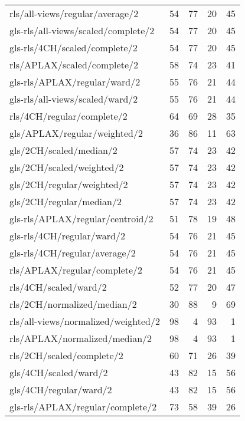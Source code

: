 \begin{longtable}{lrrrr}
    rls/all-views/regular/average/2           & 54 & 77 & 20 & 45 \\
    gls-rls/all-views/scaled/complete/2       & 54 & 77 & 20 & 45 \\
    gls-rls/4CH/scaled/complete/2             & 54 & 77 & 20 & 45 \\
    rls/APLAX/scaled/complete/2               & 58 & 74 & 23 & 41 \\
    gls-rls/APLAX/regular/ward/2              & 55 & 76 & 21 & 44 \\
    gls-rls/all-views/scaled/ward/2           & 55 & 76 & 21 & 44 \\
    rls/4CH/regular/complete/2                & 64 & 69 & 28 & 35 \\
    gls/APLAX/regular/weighted/2              & 36 & 86 & 11 & 63 \\
    gls/2CH/scaled/median/2                   & 57 & 74 & 23 & 42 \\
    gls/2CH/scaled/weighted/2                 & 57 & 74 & 23 & 42 \\
    gls/2CH/regular/weighted/2                & 57 & 74 & 23 & 42 \\
    gls/2CH/regular/median/2                  & 57 & 74 & 23 & 42 \\
    gls-rls/APLAX/regular/centroid/2          & 51 & 78 & 19 & 48 \\
    gls-rls/4CH/regular/ward/2                & 54 & 76 & 21 & 45 \\
    gls-rls/4CH/regular/average/2             & 54 & 76 & 21 & 45 \\
    rls/APLAX/regular/complete/2              & 54 & 76 & 21 & 45 \\
    rls/4CH/scaled/ward/2                     & 52 & 77 & 20 & 47 \\
    rls/2CH/normalized/median/2               & 30 & 88 &  9 & 69 \\
    rls/all-views/normalized/weighted/2       & 98 &  4 & 93 &  1 \\
    rls/APLAX/normalized/median/2             & 98 &  4 & 93 &  1 \\
    rls/2CH/scaled/complete/2                 & 60 & 71 & 26 & 39 \\
    gls/4CH/scaled/ward/2                     & 43 & 82 & 15 & 56 \\
    gls/4CH/regular/ward/2                    & 43 & 82 & 15 & 56 \\
    gls-rls/APLAX/regular/complete/2          & 73 & 58 & 39 & 26 \\

\end{longtable}
